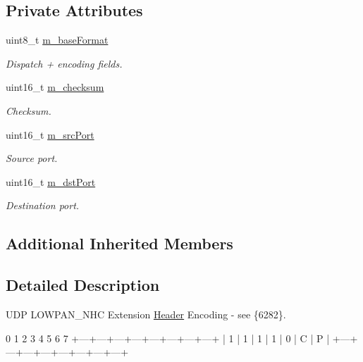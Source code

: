 \subsection*{Private Attributes}
\begin{DoxyCompactItemize}
\item 
uint8\+\_\+t \hyperlink{classns3_1_1SixLowPanUdpNhcExtension_a211cd2c058f85925f4b6a2812425805e}{m\+\_\+base\+Format}
\begin{DoxyCompactList}\small\item\em Dispatch + encoding fields. \end{DoxyCompactList}\item 
uint16\+\_\+t \hyperlink{classns3_1_1SixLowPanUdpNhcExtension_a54c1249805aaf395370a2eb92dc7e08d}{m\+\_\+checksum}
\begin{DoxyCompactList}\small\item\em Checksum. \end{DoxyCompactList}\item 
uint16\+\_\+t \hyperlink{classns3_1_1SixLowPanUdpNhcExtension_aeb61efab041137331d4a3a64574e7f5d}{m\+\_\+src\+Port}
\begin{DoxyCompactList}\small\item\em Source port. \end{DoxyCompactList}\item 
uint16\+\_\+t \hyperlink{classns3_1_1SixLowPanUdpNhcExtension_ad66622e5fda4895f8f528dce9a62202e}{m\+\_\+dst\+Port}
\begin{DoxyCompactList}\small\item\em Destination port. \end{DoxyCompactList}\end{DoxyCompactItemize}
\subsection*{Additional Inherited Members}


\subsection{Detailed Description}
U\+DP L\+O\+W\+P\+A\+N\+\_\+\+N\+HC Extension \hyperlink{classns3_1_1Header}{Header} Encoding -\/ see \{6282\}. 

\begin{DoxyVerb}   0   1   2   3   4   5   6   7
 +---+---+---+---+---+---+---+---+
 | 1 | 1 | 1 | 1 | 0 | C |   P   |
 +---+---+---+---+---+---+---+---+
\end{DoxyVerb}
 

